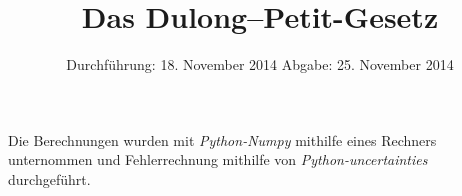 
\subject{Anfängerpraktikum V201}
\title{Das Dulong--Petit-Gesetz}
\date{
  Durchführung: 18. November 2014
  \hspace{1em}
  Abgabe: 25. November 2014
}


\maketitle
\thispagestyle{empty}
\newpage





\nocite{V201}
\printbibliography
Die Berechnungen wurden mit \textit{Python-Numpy}\cite{numpy} mithilfe eines Rechners unternommen 
und Fehlerrechnung mithilfe von \textit{Python-uncertainties}\cite{uncertainties} durchgeführt.

